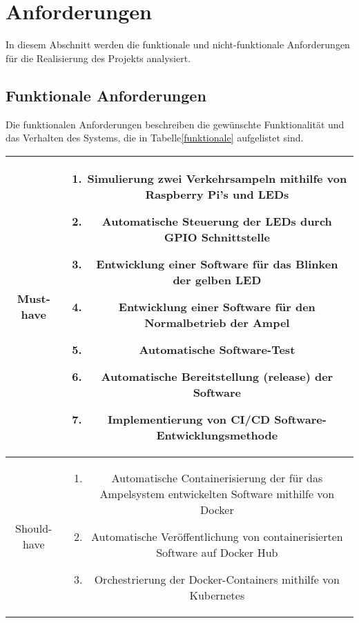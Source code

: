 \section{Anforderungen}\label{anforderungen}

In diesem Abschnitt werden die funktionale und nicht-funktionale Anforderungen für die Realisierung des Projekts analysiert.


\subsection{Funktionale Anforderungen}

Die funktionalen Anforderungen beschreiben die gewünschte Funktionalität und das Verhalten des Systems, die in Tabelle\ref{funktionale} aufgelistet sind.


\begin{table}[h!]
	\begin{flushleft}
		{\small 
			\begin{tabular}{|c|c|}
				\hline
				Must-have & 
				\begin{minipage}{5in}
					 \begin{enumerate}
					 	\item Simulierung zwei Verkehrsampeln mithilfe von Raspberry Pi’s und LEDs
					 	\item Automatische Steuerung der LEDs durch GPIO Schnittstelle
					 	\item Entwicklung einer Software für das Blinken der gelben LED
					 	\item Entwicklung einer Software für den Normalbetrieb der Ampel
					 	\item Automatische Software-Test
					 	\item Automatische Bereitstellung (release) der Software
					 	\item Implementierung von \ac{CI/CD} Software-Entwicklungsmethode
					 \end{enumerate}
				\end{minipage} \\
				\hline
				Should-have & 
				\begin{minipage}{5in}
					\begin{enumerate}
						\item Automatische Containerisierung der für das Ampelsystem entwickelten Software mithilfe von Docker
						\item Automatische Veröffentlichung von containerisierten Software auf Docker Hub
						\item Orchestrierung der Docker-Containers mithilfe von Kubernetes

\end{enumerate}
\end{minipage}
\end{tabular}}
\end{flushleft}
\end{table}
